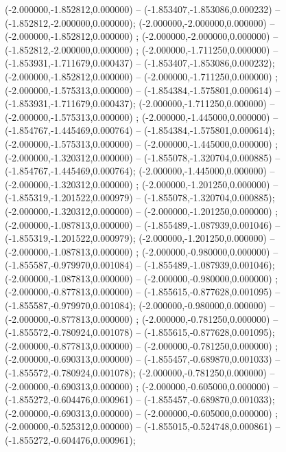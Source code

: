  (-2.000000,-1.852812,0.000000) -- (-1.853407,-1.853086,0.000232) -- (-1.852812,-2.000000,0.000000);
 (-2.000000,-2.000000,0.000000) -- (-2.000000,-1.852812,0.000000) ;
 (-2.000000,-2.000000,0.000000) -- (-1.852812,-2.000000,0.000000) ;
 (-2.000000,-1.711250,0.000000) -- (-1.853931,-1.711679,0.000437) -- (-1.853407,-1.853086,0.000232);
 (-2.000000,-1.852812,0.000000) -- (-2.000000,-1.711250,0.000000) ;
 (-2.000000,-1.575313,0.000000) -- (-1.854384,-1.575801,0.000614) -- (-1.853931,-1.711679,0.000437);
 (-2.000000,-1.711250,0.000000) -- (-2.000000,-1.575313,0.000000) ;
 (-2.000000,-1.445000,0.000000) -- (-1.854767,-1.445469,0.000764) -- (-1.854384,-1.575801,0.000614);
 (-2.000000,-1.575313,0.000000) -- (-2.000000,-1.445000,0.000000) ;
 (-2.000000,-1.320312,0.000000) -- (-1.855078,-1.320704,0.000885) -- (-1.854767,-1.445469,0.000764);
 (-2.000000,-1.445000,0.000000) -- (-2.000000,-1.320312,0.000000) ;
 (-2.000000,-1.201250,0.000000) -- (-1.855319,-1.201522,0.000979) -- (-1.855078,-1.320704,0.000885);
 (-2.000000,-1.320312,0.000000) -- (-2.000000,-1.201250,0.000000) ;
 (-2.000000,-1.087813,0.000000) -- (-1.855489,-1.087939,0.001046) -- (-1.855319,-1.201522,0.000979);
 (-2.000000,-1.201250,0.000000) -- (-2.000000,-1.087813,0.000000) ;
 (-2.000000,-0.980000,0.000000) -- (-1.855587,-0.979970,0.001084) -- (-1.855489,-1.087939,0.001046);
 (-2.000000,-1.087813,0.000000) -- (-2.000000,-0.980000,0.000000) ;
 (-2.000000,-0.877813,0.000000) -- (-1.855615,-0.877628,0.001095) -- (-1.855587,-0.979970,0.001084);
 (-2.000000,-0.980000,0.000000) -- (-2.000000,-0.877813,0.000000) ;
 (-2.000000,-0.781250,0.000000) -- (-1.855572,-0.780924,0.001078) -- (-1.855615,-0.877628,0.001095);
 (-2.000000,-0.877813,0.000000) -- (-2.000000,-0.781250,0.000000) ;
 (-2.000000,-0.690313,0.000000) -- (-1.855457,-0.689870,0.001033) -- (-1.855572,-0.780924,0.001078);
 (-2.000000,-0.781250,0.000000) -- (-2.000000,-0.690313,0.000000) ;
 (-2.000000,-0.605000,0.000000) -- (-1.855272,-0.604476,0.000961) -- (-1.855457,-0.689870,0.001033);
 (-2.000000,-0.690313,0.000000) -- (-2.000000,-0.605000,0.000000) ;
 (-2.000000,-0.525312,0.000000) -- (-1.855015,-0.524748,0.000861) -- (-1.855272,-0.604476,0.000961);
